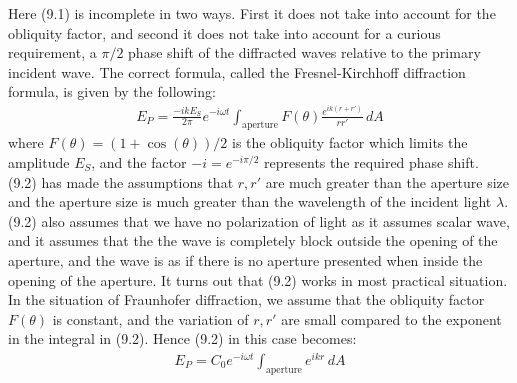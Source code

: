 \documentclass[11pt]{book}
\theoremstyle{break}
\theoremstyle{break}
\begin{document}
Here (9.1) is incomplete in two ways. First it does not take into account for the obliquity factor, and second it does not take into account for a curious requirement, a $\pi/2$ phase shift of the diffracted waves relative to the primary incident wave. The correct formula, called the Fresnel-Kirchhoff diffraction formula, is given by the following:
\begin{align}
E_P = \frac{-ikE_S}{2\pi}e^{-i\omega t}\int_{\text{aperture}}F(\theta)\frac{e^{ik(r+r')}}{rr'}\, dA
\end{align}
where $F(\theta) = (1+\cos(\theta))/2 $ is the obliquity factor which limits the amplitude $E_S$, and the factor $-i= e^{-i\pi/2}$ represents the required phase shift. (9.2) has made the assumptions that $r,r'$ are much greater than the aperture size and the aperture size is much greater than the wavelength of the incident light $\lambda$. (9.2) also assumes that we have no polarization of light as it assumes scalar wave, and it assumes that the the wave is completely block outside the opening of the aperture, and the wave is as if there is no aperture presented when inside the opening of the aperture. It turns out that (9.2) works in most practical situation. \\

In the situation of Fraunhofer diffraction,  we assume that the obliquity factor $F(\theta)$ is constant, and the variation of $r,r'$  are small compared to the exponent in the integral in (9.2). Hence (9.2) in this case becomes:
\begin{align*}
E_P = C_0 e^{-i \omega t}\int_{\text{aperture}}e^{ikr}\, dA \tag{Fraunhofer Diffraction}
\end{align*}
\end{document}

